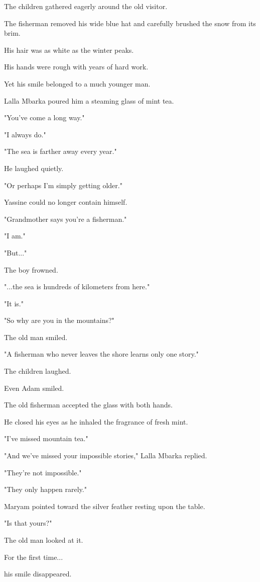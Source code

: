 \documentclass[12pt,openany]{book}
\begin{document}
The children gathered eagerly around the old visitor.

The fisherman removed his wide blue hat and carefully brushed the snow from its brim.

His hair was as white as the winter peaks.

His hands were rough with years of hard work.

Yet his smile belonged to a much younger man.

Lalla Mbarka poured him a steaming glass of mint tea.

"You've come a long way."

"I always do."

"The sea is farther away every year."

He laughed quietly.

"Or perhaps I'm simply getting older."

Yassine could no longer contain himself.

"Grandmother says you're a fisherman."

"I am."

"But..."

The boy frowned.

"...the sea is hundreds of kilometers from here."

"It is."

"So why are you in the mountains?"

The old man smiled.

"A fisherman who never leaves the shore learns only one story."

The children laughed.

Even Adam smiled.

The old fisherman accepted the glass with both hands.

He closed his eyes as he inhaled the fragrance of fresh mint.

"I've missed mountain tea."

"And we've missed your impossible stories," Lalla Mbarka replied.

"They're not impossible."

"They only happen rarely."

Maryam pointed toward the silver feather resting upon the table.

"Is that yours?"

The old man looked at it.

For the first time...

his smile disappeared.
\end{document}
